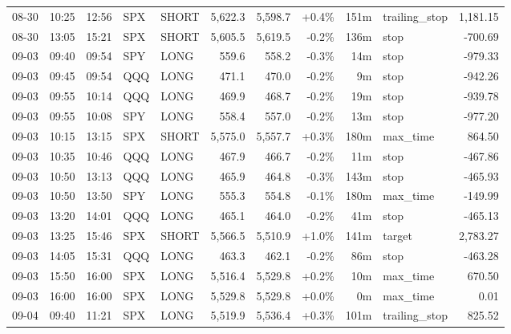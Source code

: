 \documentclass[11pt,a4paper,twoside]{article}
\begin{document}
\begin{center}
\begin{longtable}{>{\color{txtmain}}l l l l l r r r r >{\color{txtmain}}l r}
08-30 & 10:25 & 12:56 & SPX & SHORT & 5,622.3 & 5,598.7 & \textcolor{wingreen}{+0.4\%} & 151m & trailing\_stop & \textcolor{wingreen}{1,181.15} \\
08-30 & 13:05 & 15:21 & SPX & SHORT & 5,605.5 & 5,619.5 & \textcolor{lossred}{-0.2\%} & 136m & stop & \textcolor{lossred}{-700.69} \\
09-03 & 09:40 & 09:54 & SPY & LONG & 559.6 & 558.2 & \textcolor{lossred}{-0.3\%} & 14m & stop & \textcolor{lossred}{-979.33} \\
09-03 & 09:45 & 09:54 & QQQ & LONG & 471.1 & 470.0 & \textcolor{lossred}{-0.2\%} & 9m & stop & \textcolor{lossred}{-942.26} \\
09-03 & 09:55 & 10:14 & QQQ & LONG & 469.9 & 468.7 & \textcolor{lossred}{-0.2\%} & 19m & stop & \textcolor{lossred}{-939.78} \\
09-03 & 09:55 & 10:08 & SPY & LONG & 558.4 & 557.0 & \textcolor{lossred}{-0.2\%} & 13m & stop & \textcolor{lossred}{-977.20} \\
09-03 & 10:15 & 13:15 & SPX & SHORT & 5,575.0 & 5,557.7 & \textcolor{wingreen}{+0.3\%} & 180m & max\_time & \textcolor{wingreen}{864.50} \\
09-03 & 10:35 & 10:46 & QQQ & LONG & 467.9 & 466.7 & \textcolor{lossred}{-0.2\%} & 11m & stop & \textcolor{lossred}{-467.86} \\
09-03 & 10:50 & 13:13 & QQQ & LONG & 465.9 & 464.8 & \textcolor{lossred}{-0.3\%} & 143m & stop & \textcolor{lossred}{-465.93} \\
09-03 & 10:50 & 13:50 & SPY & LONG & 555.3 & 554.8 & \textcolor{lossred}{-0.1\%} & 180m & max\_time & \textcolor{lossred}{-149.99} \\
09-03 & 13:20 & 14:01 & QQQ & LONG & 465.1 & 464.0 & \textcolor{lossred}{-0.2\%} & 41m & stop & \textcolor{lossred}{-465.13} \\
09-03 & 13:25 & 15:46 & SPX & SHORT & 5,566.5 & 5,510.9 & \textcolor{wingreen}{+1.0\%} & 141m & target & \textcolor{wingreen}{2,783.27} \\
09-03 & 14:05 & 15:31 & QQQ & LONG & 463.3 & 462.1 & \textcolor{lossred}{-0.2\%} & 86m & stop & \textcolor{lossred}{-463.28} \\
09-03 & 15:50 & 16:00 & SPX & LONG & 5,516.4 & 5,529.8 & \textcolor{wingreen}{+0.2\%} & 10m & max\_time & \textcolor{wingreen}{670.50} \\
09-03 & 16:00 & 16:00 & SPX & LONG & 5,529.8 & 5,529.8 & \textcolor{wingreen}{+0.0\%} & 0m & max\_time & \textcolor{wingreen}{0.01} \\
09-04 & 09:40 & 11:21 & SPX & LONG & 5,519.9 & 5,536.4 & \textcolor{wingreen}{+0.3\%} & 101m & trailing\_stop & \textcolor{wingreen}{825.52} \\

\end{longtable}
\end{center}
\end{document}
